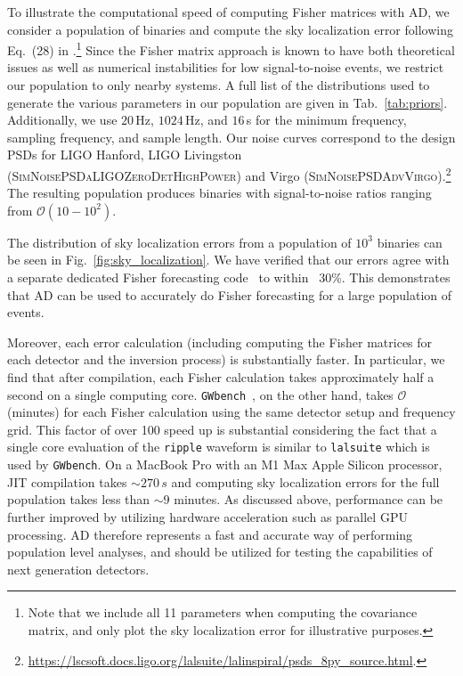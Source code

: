 \documentclass[twocolumn]{aastex631}
\newcommand{\ripple}{\texttt{ripple}\xspace}
\newcommand{\lalsuite}{\texttt{lalsuite}\xspace}
\begin{document}
To illustrate the computational speed of computing Fisher matrices with AD, we consider a population of binaries and compute the sky localization error following Eq.~(28) in \cite{Iacovelli:2022bbs, Iacovelli:2022mbg}.\footnote{
    Note that we include all 11 parameters when computing the covariance matrix, and only plot the sky localization error for illustrative purposes.
}
Since the Fisher matrix approach is known to have both theoretical issues as well as numerical instabilities for low signal-to-noise events, we restrict our population to only nearby systems.
A full list of the distributions used to generate the various parameters in our population are given in Tab.~\ref{tab:priors}. 
Additionally, we use $20\,$Hz, $1024\,$Hz, and $16\,$s for the minimum frequency, sampling frequency, and sample length.
Our noise curves correspond to the design PSDs for LIGO Hanford, LIGO Livingston (\textsc{SimNoisePSDaLIGOZeroDetHighPower}) and Virgo (\textsc{SimNoisePSDAdvVirgo}).\footnote{\url{https://lscsoft.docs.ligo.org/lalsuite/lalinspiral/psds_8py_source.html}.}
The resulting population produces binaries with signal-to-noise ratios ranging from $\mathcal{O}(10-10^2)$.

The distribution of sky localization errors from a population of $10^3$ binaries can be seen in Fig.~\ref{fig:sky_localization}.
We have verified that our errors agree with a separate dedicated Fisher forecasting code~\citep{Borhanian:2020ypi} to within ~30\%.
This demonstrates that AD can be used to accurately do Fisher forecasting for a large population of events.

Moreover, each error calculation (including computing the Fisher matrices for each detector and the inversion process) is substantially faster.
In particular, we find that after compilation, each Fisher calculation takes approximately half a second on a single computing core.
\texttt{GWbench}~\citep{Borhanian:2020ypi}, on the other hand, takes $\mathcal{O}$(minutes) for each Fisher calculation using the same detector setup and frequency grid.
This factor of over 100 speed up is substantial considering the fact that a single core evaluation of the \ripple waveform is similar to \lalsuite which is used by \texttt{GWbench}.
On a MacBook Pro with an M1 Max Apple Silicon processor, JIT compilation takes $\sim 270\,s$ and computing sky localization errors for the full population takes less than $\sim 9$ minutes.
As discussed above, performance can be further improved by utilizing hardware acceleration such as parallel GPU processing.
AD therefore represents a fast and accurate way of performing population level analyses, and should be utilized for testing the capabilities of next generation detectors.
\end{document}
